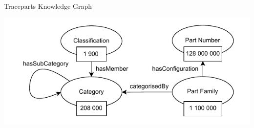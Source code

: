






\begin{frame}{Traceparts Knowledge Graph}

        \begin{center}
            \includegraphics[scale=0.9]{images/tp_kg.pdf} 
        \end{center}

\end{frame}

